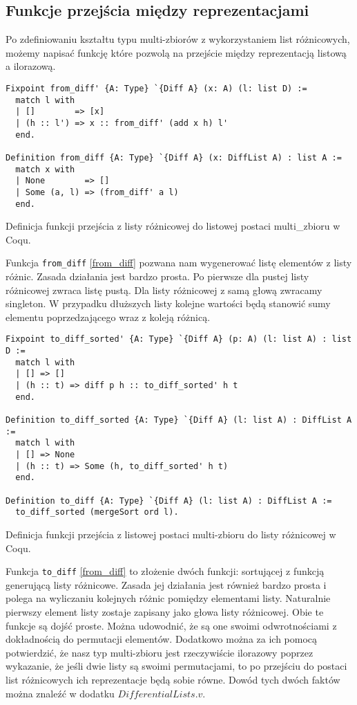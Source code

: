 \subsection{Funkcje przejścia między reprezentacjami}
Po zdefiniowaniu kształtu typu multi-zbiorów z wykorzystaniem list różnicowych, możemy napisać funkcję które pozwolą na przejście między reprezentacją listową a ilorazową.
\begin{code}
\begin{verbatim}
Fixpoint from_diff' {A: Type} `{Diff A} (x: A) (l: list D) :=
  match l with
  | []        => [x]
  | (h :: l') => x :: from_diff' (add x h) l'
  end.

Definition from_diff {A: Type} `{Diff A} (x: DiffList A) : list A :=
  match x with
  | None        => []
  | Some (a, l) => (from_diff' a l)
  end.
\end{verbatim}
\caption{Definicja funkcji przejścia z listy różnicowej do listowej postaci multi_zbioru w Coqu.}
\label{from_diff}
\end{code}

Funkcja \texttt{from_diff} \ref{from_diff} pozwana nam wygenerować listę elementów z listy różnic. Zasada działania jest bardzo prosta. Po pierwsze dla pustej listy różnicowej zwraca listę pustą. Dla listy różnicowej z samą głową zwracamy singleton. W przypadku dłuższych listy kolejne wartości będą stanowić sumy elementu poprzedzającego wraz z koleją różnicą.

\begin{code}
\begin{verbatim}
Fixpoint to_diff_sorted' {A: Type} `{Diff A} (p: A) (l: list A) : list D :=
  match l with
  | [] => []
  | (h :: t) => diff p h :: to_diff_sorted' h t
  end.

Definition to_diff_sorted {A: Type} `{Diff A} (l: list A) : DiffList A :=
  match l with
  | [] => None
  | (h :: t) => Some (h, to_diff_sorted' h t)
  end.

Definition to_diff {A: Type} `{Diff A} (l: list A) : DiffList A :=
  to_diff_sorted (mergeSort ord l).
\end{verbatim}
\caption{Definicja funkcji przejścia z listowej postaci multi-zbioru do listy różnicowej w Coqu.}
\label{to_diff}
\end{code}

Funkcja \texttt{to_diff} \ref{from_diff} to złożenie dwóch funkcji: sortującej z funkcją generującą listy różnicowe. Zasada jej działania jest również bardzo prosta i polega na wyliczaniu kolejnych różnic pomiędzy elementami listy. Naturalnie pierwszy element listy zostaje zapisany jako głowa listy różnicowej. Obie te funkcje są dojść proste. Można udowodnić, że są one swoimi odwrotnościami z dokładnością do permutacji elementów. Dodatkowo można za ich pomocą potwierdzić, że nasz typ multi-zbioru jest rzeczywiście ilorazowy poprzez wykazanie, że jeśli dwie listy są swoimi permutacjami, to po przejściu do postaci list różnicowych ich reprezentacje będą sobie równe. Dowód tych dwóch faktów można znaleźć w dodatku $DifferentialLists.v$.
